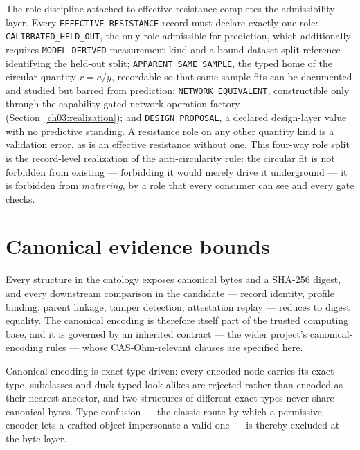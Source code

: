 The role discipline attached to effective resistance completes the admissibility layer. Every \texttt{EFFECTIVE\_RESISTANCE} record must declare exactly one role: \texttt{CALIBRATED\_HELD\_OUT}, the only role admissible for prediction, which additionally requires \texttt{MODEL\_DERIVED} measurement kind and a bound dataset-split reference identifying the held-out split; \texttt{APPARENT\_SAME\_SAMPLE}, the typed home of the circular quantity $r = a/y$, recordable so that same-sample fits can be documented and studied but barred from prediction; \texttt{NETWORK\_EQUIVALENT}, constructible only through the capability-gated network-operation factory (Section~\ref{ch03:realization}); and \texttt{DESIGN\_PROPOSAL}, a declared design-layer value with no predictive standing. A resistance role on any other quantity kind is a validation error, as is an effective resistance without one. This four-way role split is the record-level realization of the anti-circularity rule: the circular fit is not forbidden from existing --- forbidding it would merely drive it underground --- it is forbidden from \emph{mattering}, by a role that every consumer can see and every gate checks.

\section{Canonical evidence bounds}\label{ch03:canonical}

Every structure in the ontology exposes canonical bytes and a SHA-256 digest, and every downstream comparison in the candidate --- record identity, profile binding, parent linkage, tamper detection, attestation replay --- reduces to digest equality. The canonical encoding is therefore itself part of the trusted computing base, and it is governed by an inherited contract --- the wider project's canonical-encoding rules --- whose CAS-Ohm-relevant clauses are specified here.

\begin{invariant}\label{ch03:inv:exacttype}
Canonical encoding is exact-type driven: every encoded node carries its exact type, subclasses and duck-typed look-alikes are rejected rather than encoded as their nearest ancestor, and two structures of different exact types never share canonical bytes. Type confusion --- the classic route by which a permissive encoder lets a crafted object impersonate a valid one --- is thereby excluded at the byte layer.
\end{invariant}

